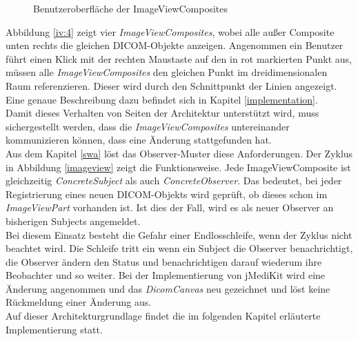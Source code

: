 \begin{figure}[htb]
\centering
{}
\caption{Benutzeroberfläche der ImageViewComposites}
\label{ivcomposite}
\end{figure}

Abbildung \ref{iv:4} zeigt vier \textit{ImageViewComposites}, wobei alle außer Composite unten rechts die gleichen DICOM-Objekte anzeigen.
Angenommen ein Benutzer führt einen Klick mit der rechten Maustaste auf den in rot markierten Punkt aus, müssen alle \textit{ImageViewComposites} den gleichen Punkt im dreidimensionalen Raum referenzieren. Dieser wird durch den Schnittpunkt der Linien angezeigt. Eine genaue Beschreibung dazu befindet sich in Kapitel \ref{implementation}.\\
Damit dieses Verhalten von Seiten der Architektur unterstützt wird, muss sichergestellt werden, dass die \textit{ImageViewComposites} untereinander kommunizieren können, dass eine Änderung stattgefunden hat.\\
Aus dem Kapitel \ref{swa} löst das Observer-Muster diese Anforderungen. Der Zyklus in Abbildung \ref{imageview} zeigt die Funktionsweise. Jede ImageViewComposite ist gleichzeitig \textit{ConcreteSubject} als auch \textit{ConcreteObserver}. Das bedeutet, bei jeder Registrierung eines neuen DICOM-Objekts wird geprüft, ob dieses schon im \textit{ImageViewPart} vorhanden ist. Ist dies der Fall, wird es als neuer Observer an bisherigen Subjects angemeldet.\\
Bei diesem Einsatz besteht die Gefahr einer Endlosschleife, wenn der Zyklus nicht beachtet wird. Die Schleife tritt ein wenn ein Subject die Observer benachrichtigt, die Observer ändern den Status und benachrichtigen darauf wiederum ihre Beobachter und so weiter. Bei der Implementierung von jMediKit wird eine Änderung angenommen und das \textit{DicomCanvas} neu gezeichnet und löst keine Rückmeldung einer Änderung aus. \\
Auf dieser Architekturgrundlage findet die im folgenden Kapitel erläuterte Implementierung statt.